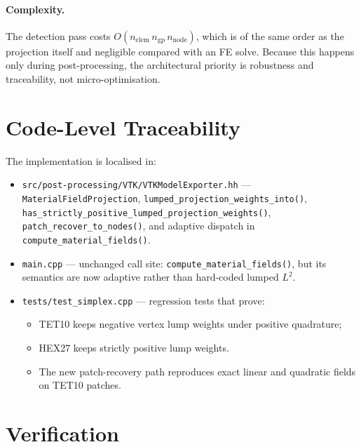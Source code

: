 \paragraph{Complexity.}
The detection pass costs
$O(n_{\mathrm{elem}}\,n_{\mathrm{gp}}\,n_{\mathrm{node}})$, which is of the
same order as the projection itself and negligible compared with an FE solve.
Because this happens only during post-processing, the architectural priority is
robustness and traceability, not micro-optimisation.


\section{Code-Level Traceability}
\label{sec:adaptive_traceability}

The implementation is localised in:
\begin{itemize}[nosep]
  \item \texttt{src/post-processing/VTK/VTKModelExporter.hh}
        — \texttt{MaterialFieldProjection},
        \texttt{lumped\_projection\_weights\_into()},
        \texttt{has\_strictly\_positive\_lumped\_projection\_weights()},
        \texttt{patch\_recover\_to\_nodes()}, and adaptive dispatch in
        \texttt{compute\_material\_fields()}.
  \item \texttt{main.cpp}
        — unchanged call site: \texttt{compute\_material\_fields()},
        but its semantics are now adaptive rather than hard-coded lumped $L^2$.
  \item \texttt{tests/test\_simplex.cpp}
        — regression tests that prove:
        \begin{itemize}[nosep]
          \item TET10 keeps negative vertex lump weights under positive
                quadrature;
          \item HEX27 keeps strictly positive lump weights.
          \item The new patch-recovery path reproduces exact linear and
                quadratic fields on TET10 patches.
        \end{itemize}
\end{itemize}


\section{Verification}
\label{sec:adaptive_verification}

